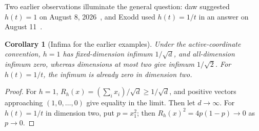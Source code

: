 \documentclass[11pt]{article}
\newtheorem{corollary}[theorem]{Corollary}
\begin{document}
Two earlier observations illuminate the general question:
daw suggested $h(t)=1$ on August 8, 2026~\cite{daw}, and
Exodd used $h(t)=1/t$ in an answer on August 11~\cite{exodd}.
\begin{corollary}[Infima for the earlier examples]\label{cor:examples}
Under the active-coordinate convention, $h=1$ has fixed-dimension
infimum $1/\sqrt d$, and all-dimension infimum zero, whereas
dimensions at most two give infimum $1/\sqrt2$.
For $h(t)=1/t$, the infimum is already zero in dimension two.
\end{corollary}
\begin{proof}
For $h=1$, $R_h(x)=(\sum_i x_i)/\sqrt d\ge1/\sqrt d$,
and positive vectors approaching $(1,0,\ldots,0)$ give equality
in the limit. Then let $d\to\infty$.
For $h(t)=1/t$ in dimension two, put $p=x_1^2$;
then $R_h(x)^2=4p(1-p)\to0$ as $p\to0$.
\end{proof}
\end{document}
